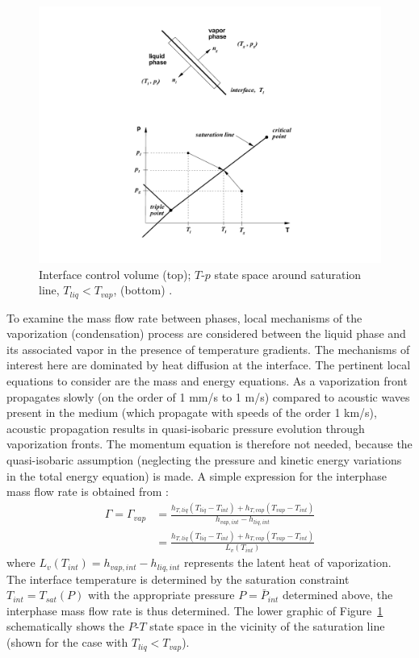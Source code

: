 \begin{figure}[H]
  \centering
   \includegraphics[clip=true,viewport=200 50 550 500,width=.8\textwidth]{figures/SEM/saturation}
   \caption{Interface control volume (top); $T$-$p$ state space around
     saturation line, $T_{liq} < T_{vap}$, (bottom) \cite{SEM}.\label{Berry-Fig:2}}
\end{figure}

To examine the mass flow rate between phases, local mechanisms of the
vaporization (condensation) process are considered between the liquid
phase and its associated vapor in the presence of temperature
gradients.  The mechanisms of interest here are dominated by heat
diffusion at the interface.  The pertinent local equations to consider
are the mass and energy equations.  As a vaporization front propagates
slowly (on the order of 1 mm/s to 1 m/s) compared to acoustic waves
present in the medium (which propagate with speeds of the order 1
km/s), acoustic propagation results in quasi-isobaric pressure
evolution through vaporization fronts.  The momentum equation is
therefore not needed, because the quasi-isobaric assumption
(neglecting the pressure and kinetic energy variations in the total
energy equation) is made.  A simple expression for the interphase
mass flow rate is obtained from \cite{SEM}:
\begin{align}
  \nonumber
  \Gamma = \Gamma_{vap}
  &= \frac{h_{T,  liq} \left( T_{liq} - T_{int} \right) + h_{T,  vap} \left( T_{vap} - T_{int} \right)}{h_{vap,  int} - h_{liq,  int}}
  \\
  &= \frac{h_{T,  liq} \left( T_{liq} - T_{int} \right) + h_{T,  vap} \left( T_{vap} - T_{int} \right)}{L_v \left( T_{int} \right)}
\end{align}
where $L_v \left( T_{int} \right) = h_{vap,  int} - h_{liq,  int}$
represents the latent heat of vaporization.  The interface
temperature is determined by the saturation constraint
$T_{int}=T_{sat}(P)$ with the appropriate pressure $P=\bar{P}_{int}$
determined above, the interphase mass flow rate is thus determined.
The lower graphic of Figure~\ref{Berry-Fig:2} schematically shows the
$P$-$T$ state space in the vicinity of the saturation line (shown
for the case with $T_{liq} < T_{vap}$).

